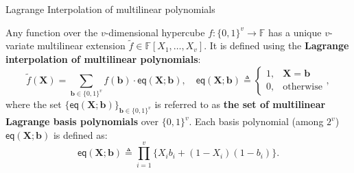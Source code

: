 \documentclass{zkdl-presentation-template}
\begin{document}
    \begin{frame}{Lagrange Interpolation of multilinear polynomials}
        \begin{theorem}
            Any function over the $v$-dimensional hypercube $f: \{0,1\}^v \to
            \mathbb{F}$ has a unique $v$-variate multilinear extension $\widetilde{f}
            \in \mathbb{F}[X_1,\dots,X_v]$. It is defined using the \textbf{Lagrange
            interpolation of multilinear polynomials}:
            \begin{equation*}
                \widetilde{f}(\mathbf{X}) = \sum_{\boldsymbol{b} \in \{0,1\}^v} f(\boldsymbol{b}) \cdot \mathsf{eq}(\mathbf{X};\boldsymbol{b}),
                \quad \mathsf{eq}(\mathbf{X}; \boldsymbol{b}) \triangleq \begin{cases}
                    1, & \mathbf{X} = \boldsymbol{b} \\
                    0, & \text{otherwise}
                \end{cases},
            \end{equation*}
            where the set $\{\mathsf{eq}(\mathbf{X};
            \boldsymbol{b})\}_{\boldsymbol{b} \in \{0,1\}^v}$ is referred to as
            \textbf{the set of multilinear Lagrange basis polynomials} over
            $\{0,1\}^v$. \pause Each basis polynomial (among $2^v$)
            $\mathsf{eq}(\mathbf{X};\boldsymbol{b})$ is defined as:
            \begin{equation*}
                \mathsf{eq}(\mathbf{X};\boldsymbol{b}) \triangleq \prod_{i=1}^v \{X_ib_i + (1-X_i)(1-b_i) \}.
            \end{equation*}
        \end{theorem}
    \end{frame}
\end{document}
